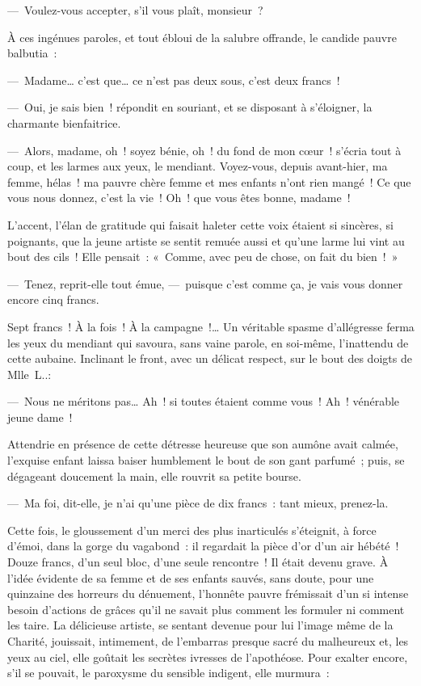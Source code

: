 \documentclass[french,twoside]{book} %
\begin{document}
— Voulez-vous accepter, s’il vous plaît, monsieur ?\par
À ces ingénues paroles, et tout ébloui de la salubre offrande, le candide pauvre balbutia :\par
— Madame… c’est que… ce n’est pas deux sous, c’est deux francs !\par
— Oui, je sais bien ! répondit en souriant, et se disposant à s’éloigner, la charmante bienfaitrice.\par
— Alors, madame, oh ! soyez bénie, oh ! du fond de mon cœur ! s’écria tout à coup, et les larmes aux yeux, le mendiant. Voyez-vous, depuis avant-hier, ma femme, hélas ! ma pauvre chère femme et mes enfants n’ont rien mangé ! Ce que vous nous donnez, c’est la vie ! Oh ! que vous êtes bonne, madame !\par
L’accent, l’élan de gratitude qui faisait haleter   cette voix étaient si sincères, si poignants, que la jeune artiste se sentit remuée aussi et qu’une larme lui vint au bout des cils ! Elle pensait : « Comme, avec peu de chose, on fait du bien ! »\par
— Tenez, reprit-elle tout émue, — puisque c’est comme ça, je vais vous donner encore cinq francs.\par
Sept francs ! À la fois ! À la campagne !… Un véritable spasme d’allégresse ferma les yeux du mendiant qui savoura, sans vaine parole, en soi-même, l’inattendu de cette aubaine. Inclinant le front, avec un délicat respect, sur le bout des doigts de Mlle L..:\par
— Nous ne méritons pas… Ah ! si toutes étaient comme vous ! Ah ! vénérable jeune dame !\par
Attendrie en présence de cette détresse heureuse que son aumône avait calmée, l’exquise enfant laissa baiser humblement le bout de son gant parfumé ; puis, se dégageant doucement la main, elle rouvrit sa petite bourse.\par
— Ma foi, dit-elle, je n’ai qu’une pièce de dix francs : tant mieux, prenez-la.\par
   Cette fois, le gloussement d’un merci des plus inarticulés s’éteignit, à force d’émoi, dans la gorge du vagabond : il regardait la pièce d’or d’un air hébété ! Douze francs, d’un seul bloc, d’une seule rencontre ! Il était devenu grave. À l’idée évidente de sa femme et de ses enfants sauvés, sans doute, pour une quinzaine des horreurs du dénuement, l’honnête pauvre frémissait d’un si intense besoin d’actions de grâces qu’il ne savait plus comment les formuler ni comment les taire. La délicieuse artiste, se sentant devenue pour lui l’image même de la Charité, jouissait, intimement, de l’embarras presque sacré du malheureux et, les yeux au ciel, elle goûtait les secrètes ivresses de l’apothéose. Pour exalter encore, s’il se pouvait, le paroxysme du sensible indigent, elle murmura :\par
\end{document}
